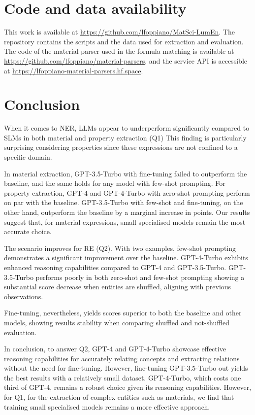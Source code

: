\section{Code and data availability}
This work is available at \url{https://github.com/lfoppiano/MatSci-LumEn}. The repository contains the scripts and the data used for extraction and evaluation. 
The code of the material parser used in the formula matching is available at \url{https://github.com/lfoppiano/material-parsers}, and the service API is accessible at \url{https://lfoppiano-material-parsers.hf.space}. 

\section{Conclusion}

When it comes to NER, LLMs appear to underperform significantly compared to SLMs in both material and property extraction (Q1)
This finding is particularly surprising considering properties since these expressions are not confined to a specific domain.

In material extraction, GPT-3.5-Turbo with fine-tuning failed to outperform the baseline, and the same holds for any model with few-shot prompting. 
For property extraction, GPT-4 and GPT-4-Turbo with zero-shot prompting perform on par with the baseline. GPT-3.5-Turbo with few-shot and fine-tuning, on the other hand, outperform the baseline by a marginal increase in points.
Our results suggest that, for material expressions, small specialised models remain the most accurate choice.

The scenario improves for RE (Q2).
With two examples, few-shot prompting demonstrates a significant improvement over the baseline.
GPT-4-Turbo exhibits enhanced reasoning capabilities compared to GPT-4 and GPT-3.5-Turbo.
GPT-3.5-Turbo performs poorly in both zero-shot and few-shot prompting showing a substantial score decrease when entities are shuffled, aligning with previous observations.
    
Fine-tuning, nevertheless, yields scores superior to both the baseline and other models, showing results stability when comparing shuffled and not-shuffled evaluation.

In conclusion, to answer Q2, GPT-4 and GPT-4-Turbo showcase effective reasoning capabilities for accurately relating concepts and extracting relations without the need for fine-tuning. However, fine-tuning GPT-3.5-Turbo out yields the best results with a relatively small dataset. 
GPT-4-Turbo, which costs one third of GPT-4, remains a robust choice given its reasoning capabilities. 
However, for Q1, for the extraction of complex entities such as materials, we find that training small specialised models remains a more effective approach.

